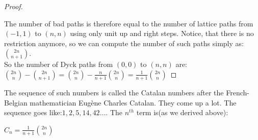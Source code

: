 \begin{proof}
\begin{figure}
    \end{figure}
The number of bad paths is therefore equal to the number of lattice paths from $(-1, 1)$ to $(n, n)$ using only unit up and right steps.  Notice, that there is no restriction anymore, so we can compute the number of such paths simply as: $\binom{2n}{n+1}$.\\
So the number of Dyck paths from $(0,0)$ to $(n,n)$ are:\\
$\binom{2n}{n} - \binom{2n}{n+1} = \binom{2n}{n} - \frac{n}{n+1} \binom{2n}{n} = \frac{1}{n+1} \binom{2n}{n}$
\end{proof}
The sequence of such numbers is called the Catalan numbers after the French-Belgian mathematician Eugène Charles Catalan. They come up a lot. The sequence goes like:$1, 2, 5, 14, 42 \dots$. The $n^{th}$ term is(as we derived above):
\begin{theorem}
    $C_n=\frac{1}{n+1} \binom{2n}{n}$
\end{theorem}

